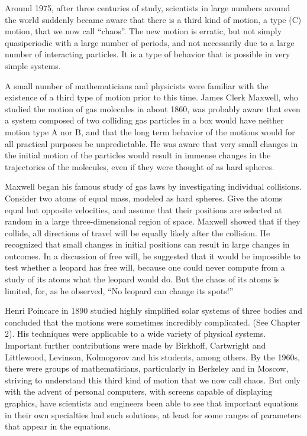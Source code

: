 \documentclass[12pt]{article}
\begin{document}
Around 1975, after three centuries of study, scientists in large numbers around the world suddenly became 
aware that there is a third kind of motion, a type (C) motion, that we now call “chaos”. The new motion is 
erratic, but not simply quasiperiodic with a large number of periods, and not necessarily due to a large 
number of interacting particles. It is a type of behavior that is possible in very simple systems.

A small number of mathematicians and physicists were familiar with the existence of a third type of motion 
prior to this time. James Clerk Maxwell, who studied the motion of gas molecules in about 1860, was 
probably aware that even a system composed of two colliding gas particles in a box would have neither 
motion type A nor B, and that the long term behavior of the motions would for all practical purposes be 
unpredictable. He was aware that very small changes in the initial motion of the particles would result in 
immense changes in the trajectories of the molecules, even if they were thought of as hard spheres.

Maxwell began his famous study of gas laws by investigating individual collisions. Consider two atoms of 
equal mass, modeled as hard spheres. Give the atoms equal but opposite velocities, and assume that their 
positions are selected at random in a large three-dimensional region of space. Maxwell showed that if they 
collide, all directions of travel will be equally likely after the collision. He recognized that small 
changes in initial positions can result in large changes in outcomes. In a discussion of free will, he 
suggested that it would be impossible to test whether a leopard has free will, because one could never 
compute from a study of its atoms what the leopard would do. But the chaos of its atoms is limited, for, as 
he observed, “No leopard can change its spots!”

Henri Poincare in 1890 studied highly simplified solar systems of three bodies and concluded that the 
motions were sometimes incredibly complicated. (See Chapter 2). His techniques were applicable to a wide 
variety of physical systems. Important further contributions were made by Birkhoff, Cartwright and 
Littlewood, Levinson, Kolmogorov and his students, among others. By the 1960s, there were groups of 
mathematicians, particularly in Berkeley and in Moscow, striving to understand this third kind of motion 
that we now call chaos. But only with the advent of personal computers, with screens capable of displaying 
graphics, have scientists and engineers been able to see that important equations in their own specialties 
had such solutions, at least for some ranges of parameters that appear in the equations.
\end{document}
